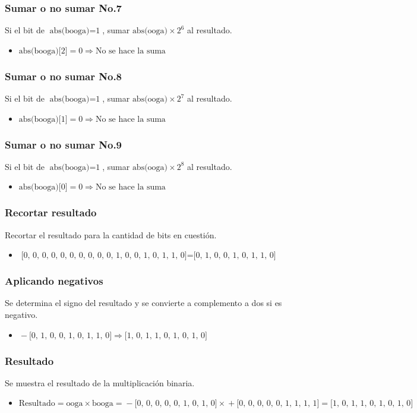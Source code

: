\documentclass{beamer}
\begin{document}
\begin{frame}
\frametitle{Sumar o no sumar No.7}
Si el bit de $\text{abs(booga)}=\text{1}$, sumar $\text{abs(ooga)}\times\text{2}^{\text{6}}$ al resultado.
\begin{itemize}
\item $\text{abs(booga)[2]}=\text{0}\Longrightarrow\text{No se hace la suma}$
\end{itemize}
\end{frame}
\begin{frame}
\frametitle{Sumar o no sumar No.8}
Si el bit de $\text{abs(booga)}=\text{1}$, sumar $\text{abs(ooga)}\times\text{2}^{\text{7}}$ al resultado.
\begin{itemize}
\item $\text{abs(booga)[1]}=\text{0}\Longrightarrow\text{No se hace la suma}$
\end{itemize}
\end{frame}
\begin{frame}
\frametitle{Sumar o no sumar No.9}
Si el bit de $\text{abs(booga)}=\text{1}$, sumar $\text{abs(ooga)}\times\text{2}^{\text{8}}$ al resultado.
\begin{itemize}
\item $\text{abs(booga)[0]}=\text{0}\Longrightarrow\text{No se hace la suma}$
\end{itemize}
\end{frame}
\begin{frame}
\frametitle{Recortar resultado}
Recortar el resultado para la cantidad de bits en cuestión.
\begin{itemize}
\item $\text{[0, 0, 0, 0, 0, 0, 0, 0, 0, 0, 1, 0, 0, 1, 0, 1, 1, 0]}=\text{[0, 1, 0, 0, 1, 0, 1, 1, 0]}$
\end{itemize}
\end{frame}
\begin{frame}
\frametitle{Aplicando negativos}
Se determina el signo del resultado y se convierte a complemento a dos si es negativo.
\begin{itemize}
\item $\text{}-\text{[0, 1, 0, 0, 1, 0, 1, 1, 0]}\Longrightarrow\text{[1, 0, 1, 1, 0, 1, 0, 1, 0]}$
\end{itemize}
\end{frame}
\begin{frame}
\frametitle{Resultado}
Se muestra el resultado de la multiplicación binaria.
\begin{itemize}
\item $\text{Resultado}=\text{ooga}\times\text{booga}=\text{}-\text{[0, 0, 0, 0, 0, 1, 0, 1, 0]}\times\text{}+\text{[0, 0, 0, 0, 0, 1, 1, 1, 1]}=\text{[1, 0, 1, 1, 0, 1, 0, 1, 0]}$
\end{itemize}
\end{frame}

\begin{frame}
\maketitle
{}
\end{frame}
\end{document}
